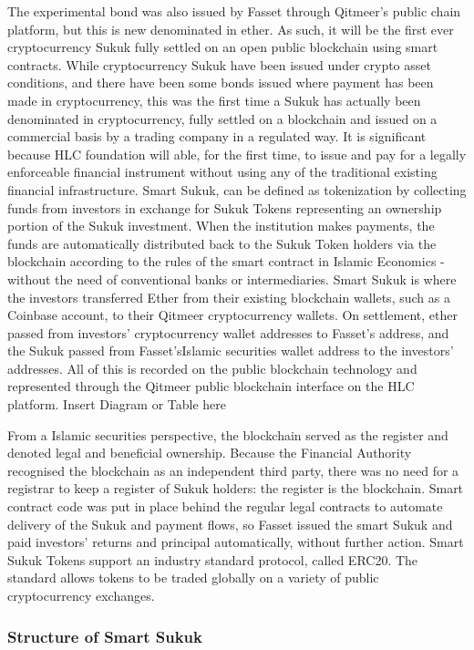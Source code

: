 \documentclass[a4paper,11pt]{article}
\begin{document}
The experimental bond was also issued by Fasset  through Qitmeer’s public chain platform, but this is new  denominated in ether. As such, it will be the first ever cryptocurrency Sukuk fully settled on an open public blockchain using smart contracts. While cryptocurrency Sukuk have been issued under crypto asset conditions, and there have been some bonds issued where payment has been made in cryptocurrency, this was the first time a Sukuk has actually been denominated in cryptocurrency, fully settled on a blockchain and issued on a commercial basis by a trading company in a regulated way. It is significant because HLC foundation will able, for the first time, to issue and pay for a legally enforceable financial instrument without using any of the traditional existing financial infrastructure.
Smart Sukuk, can be defined as tokenization by collecting funds from investors in exchange for Sukuk Tokens representing an ownership portion of the Sukuk investment. When the institution makes payments, the funds are automatically distributed back to the Sukuk Token holders via the blockchain according to the rules of the smart contract in Islamic Economics - without the need of conventional banks or intermediaries.
Smart Sukuk is where the investors transferred Ether from their existing blockchain wallets, such as a Coinbase account, to their Qitmeer cryptocurrency wallets. On settlement, ether passed from investors’ cryptocurrency wallet addresses to Fasset’s address, and the Sukuk passed from Fasset’sIslamic securities wallet address to the investors’ addresses. All of this is recorded on the public blockchain technology and represented through the Qitmeer public blockchain interface on the HLC platform. 
                                    Insert Diagram or Table here

From a Islamic securities perspective, the blockchain served as the register and denoted legal and beneficial ownership. Because the Financial Authority recognised the blockchain as an independent third party, there was no need for a registrar to keep a register of Sukuk holders: the register is the blockchain. Smart contract code was put in place behind the regular legal contracts to automate delivery of the Sukuk and payment flows, so Fasset issued the smart Sukuk and paid investors’ returns and principal automatically, without further action.
Smart Sukuk Tokens support an industry standard protocol, called ERC20. The standard allows tokens to be traded globally on a variety of public cryptocurrency exchanges.

\subsubsection{Structure of Smart Sukuk}
\end{document}
